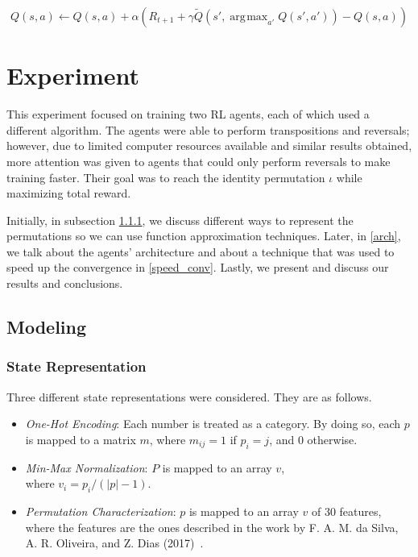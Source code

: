 \documentclass[11pt,twoside]{article}
\DeclareMathOperator*{\argmax}{\arg\!\max}
\begin{document}
\begin{equation}\label{double_equation}
	Q(s, a) \leftarrow Q(s, a) + \alpha (R_{t+1} + \gamma \widetilde{Q}(s', \argmax_{a'}{Q(s', a')}) - Q(s,a))
\end{equation}


\section{Experiment}\label{section:expr}

This experiment focused on training two RL agents, each of which used a different algorithm. The agents were able to perform transpositions and reversals; however, due to limited computer resources available and similar results obtained, more attention was given to agents that could only perform reversals to make training faster. Their goal was to reach the identity permutation $\iota$ while maximizing total reward. 

Initially, in subsection \ref{state_rep}, we discuss different ways to represent the permutations so we can use function approximation techniques. Later, in \ref{arch}, we talk about the agents' architecture and about a technique that was used to speed up the convergence in \ref{speed_conv}. Lastly, we present and discuss our results and conclusions.

\subsection{Modeling}

\subsubsection{State Representation}\label{state_rep}

Three different state representations were considered. They are as follows.

\begin{itemize}
	\item \textit{One-Hot Encoding}: Each number is treated as a category. By doing so, each $p$ is mapped to a matrix $m$, where $m_{ij} = 1$ if $p_i = j$, and $0$ otherwise. 
	\item \textit{Min-Max Normalization}: $P$ is mapped to an array $v$,\\ where $v_i = p_i / (|p| - 1)$.
	\item \textit{Permutation Characterization}: $p$ is mapped to an array $v$ of $30$ features, where the features are the ones described in the work by F. A. M. da Silva, A. R. Oliveira, and Z. Dias (2017)~\cite{flavio}.
\end{itemize}
\end{document}

